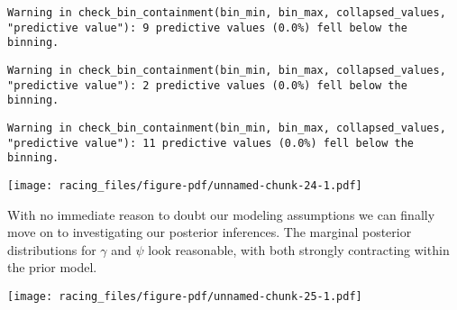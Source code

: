 \documentclass[
  letterpaper,
  DIV=11,
  numbers=noendperiod]{scrartcl}
\newenvironment{Shaded}{\begin{snugshade}}{\end{snugshade}}
\newcommand{\AttributeTok}[1]{\textcolor[rgb]{0.40,0.45,0.13}{#1}}
\newcommand{\DecValTok}[1]{\textcolor[rgb]{0.68,0.00,0.00}{#1}}
\newcommand{\FunctionTok}[1]{\textcolor[rgb]{0.28,0.35,0.67}{#1}}
\newcommand{\NormalTok}[1]{\textcolor[rgb]{0.00,0.23,0.31}{#1}}
\newcommand{\SpecialCharTok}[1]{\textcolor[rgb]{0.37,0.37,0.37}{#1}}
\newcommand{\StringTok}[1]{\textcolor[rgb]{0.13,0.47,0.30}{#1}}
\begin{document}
\begin{verbatim}
Warning in check_bin_containment(bin_min, bin_max, collapsed_values,
"predictive value"): 9 predictive values (0.0%) fell below the binning.
\end{verbatim}

\begin{verbatim}
Warning in check_bin_containment(bin_min, bin_max, collapsed_values,
"predictive value"): 2 predictive values (0.0%) fell below the binning.
\end{verbatim}

\begin{verbatim}
Warning in check_bin_containment(bin_min, bin_max, collapsed_values,
"predictive value"): 11 predictive values (0.0%) fell below the binning.
\end{verbatim}

\texttt{[image: racing\_files/figure-pdf/unnamed-chunk-24-1.pdf]}

With no immediate reason to doubt our modeling assumptions we can
finally move on to investigating our posterior inferences. The marginal
posterior distributions for \(\gamma\) and \(\psi\) look reasonable,
with both strongly contracting within the prior model.

\begin{Shaded}
\end{Shaded}

\texttt{[image: racing\_files/figure-pdf/unnamed-chunk-25-1.pdf]}
\end{document}
